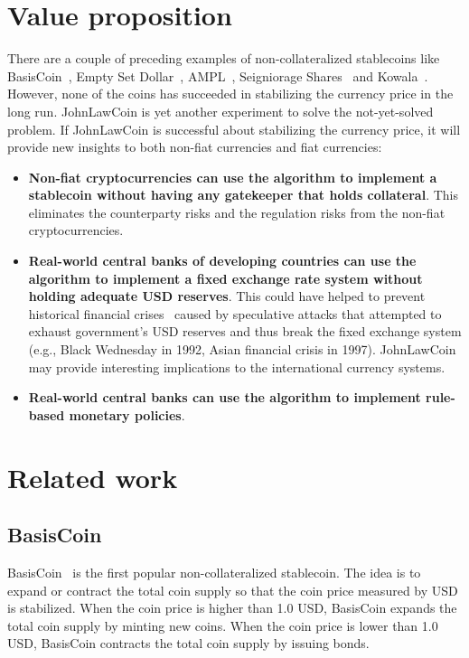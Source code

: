 \documentclass[dvipdfmx,a4paper]{article}
\begin{document}
\section{Value proposition}

There are a couple of preceding examples of non-collateralized stablecoins like BasisCoin~\cite{basiscoin}, Empty Set Dollar~\cite{emptysetdollar}, AMPL~\cite{ampl}, Seigniorage Shares~\cite{seigniorage} and Kowala~\cite{kowala}. However, none of the coins has succeeded in stabilizing the currency price in the long run. JohnLawCoin is yet another experiment to solve the not-yet-solved problem. If JohnLawCoin is successful about stabilizing the currency price, it will provide new insights to both non-fiat currencies and fiat currencies:

\begin{itemize}
\item \textbf{Non-fiat cryptocurrencies can use the algorithm to implement a stablecoin without having any gatekeeper that holds collateral}. This eliminates the counterparty risks and the regulation risks from the non-fiat cryptocurrencies.
\item \textbf{Real-world central banks of developing countries can use the algorithm to implement a fixed exchange rate system without holding adequate USD reserves}. This could have helped to prevent historical financial crises~\cite{ferguson2008ascent} caused by speculative attacks that attempted to exhaust government's USD reserves and thus break the fixed exchange system (e.g., Black Wednesday in 1992, Asian financial crisis in 1997). JohnLawCoin may provide interesting implications to the international currency systems.
\item \textbf{Real-world central banks can use the algorithm to implement rule-based monetary policies}.
\end{itemize}

\section{Related work}

\subsection{BasisCoin}

BasisCoin~\cite{basiscoin} is the first popular non-collateralized stablecoin. The idea is to expand or contract the total coin supply so that the coin price measured by USD is stabilized. When the coin price is higher than 1.0 USD, BasisCoin expands the total coin supply by minting new coins. When the coin price is lower than 1.0 USD, BasisCoin contracts the total coin supply by issuing bonds.
\end{document}
